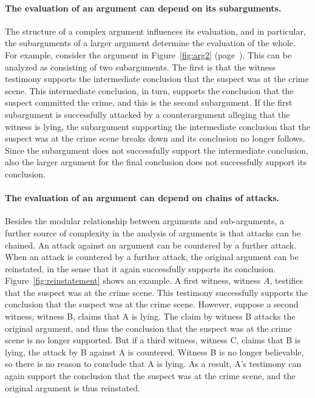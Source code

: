 \documentclass[10pt]{article}
\begin{document}
\paragraph{The evaluation of an argument can depend on its subarguments.} %
The structure of a complex argument influences its evaluation, and in particular, the subarguments of a larger argument determine the evaluation of the whole. 
For example, consider the argument in Figure~\ref{fig:arg2} (page~\pageref{fig:arg2}). This can be analyzed as consisting of two subarguments.
The first is that the witness testimony supports the intermediate conclusion 
that the suspect was at the crime scene. This intermediate conclusion, in turn, supports the conclusion that 
the suspect committed the crime, and this is the second subargument. If the first subargument is successfully attacked by a counterargument alleging that the witness is lying,  
the subargument supporting the intermediate conclusion that the suspect was at the crime scene breaks down and its conclusion no longer follows. %
Since the subargument does not successfully support the intermediate conclusion, also the larger argument for the final conclusion does not successfully support its conclusion.

\paragraph{The evaluation of an argument can depend on chains of attacks.} %
Besides the modular relationship between arguments and sub-arguments, a further source of complexity in the analysis of 
arguments is that attacks can be chained. An attack against an argument can be countered by a further attack. When an attack is countered by a further attack, 
the original argument can be reinstated, in the sense that it again successfully supports its conclusion. Figure~\ref{fig:reinstatement} shows an example. A first witness, witness $A$, testifies that the suspect was at the crime scene. This testimony successfully 
supports the conclusion that the suspect was at the crime scene. However, suppose a second witness, witness B, claims that A is lying. 
The claim by witness B attacks the original argument, and thus 
the conclusion that the suspect was at the crime scene is no longer supported. But if a third witness, witness C, claims that B is lying, 
the attack by B against A is countered. Witness B is no longer believable, so there is no reason to conclude that  A is lying. As a result, A's testimony can 
again support the conclusion that the suspect was at the crime scene, and the original argument is thus reinstated. 
\end{document}
